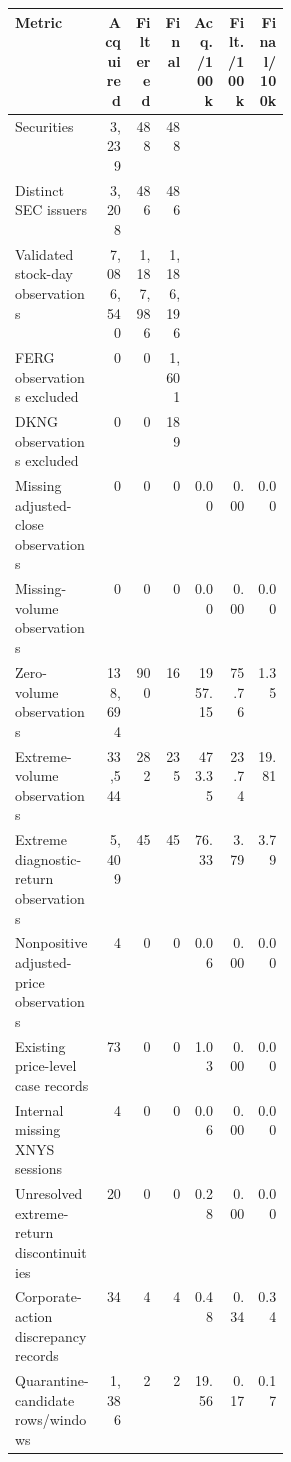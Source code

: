 \begin{tabular}{@{}p{0.32\linewidth}rrrrrr@{}}
\toprule
Metric & Acquired & Filtered & Final & Acq./100k & Filt./100k & Final/100k \\
\midrule
Securities & 3,239 & 488 & 488 &  &  &  \\
Distinct SEC issuers & 3,208 & 486 & 486 &  &  &  \\
Validated stock-day observations & 7,086,540 & 1,187,986 & 1,186,196 &  &  &  \\
FERG observations excluded & 0 & 0 & 1,601 &  &  &  \\
DKNG observations excluded & 0 & 0 & 189 &  &  &  \\
Missing adjusted-close observations & 0 & 0 & 0 & 0.00 & 0.00 & 0.00 \\
Missing-volume observations & 0 & 0 & 0 & 0.00 & 0.00 & 0.00 \\
Zero-volume observations & 138,694 & 900 & 16 & 1957.15 & 75.76 & 1.35 \\
Extreme-volume observations & 33,544 & 282 & 235 & 473.35 & 23.74 & 19.81 \\
Extreme diagnostic-return observations & 5,409 & 45 & 45 & 76.33 & 3.79 & 3.79 \\
Nonpositive adjusted-price observations & 4 & 0 & 0 & 0.06 & 0.00 & 0.00 \\
Existing price-level case records & 73 & 0 & 0 & 1.03 & 0.00 & 0.00 \\
Internal missing XNYS sessions & 4 & 0 & 0 & 0.06 & 0.00 & 0.00 \\
Unresolved extreme-return discontinuities & 20 & 0 & 0 & 0.28 & 0.00 & 0.00 \\
Corporate-action discrepancy records & 34 & 4 & 4 & 0.48 & 0.34 & 0.34 \\
Quarantine-candidate rows/windows & 1,386 & 2 & 2 & 19.56 & 0.17 & 0.17 \\
\bottomrule
\end{tabular}
